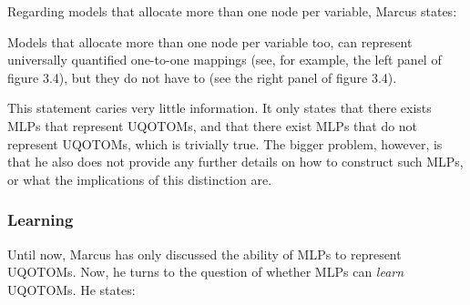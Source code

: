 \documentclass[../../main.tex]{subfiles}
\begin{document}
\begin{critique}
\begin{example}
        \begin{center}
            \label{fig:non_injective_function}
        \end{center}
    \end{example}
\end{critique}

Regarding models that allocate more than one node per variable, Marcus states:

\begin{citecallout}
    Models that allocate more than one node per variable too, can represent
    universally quantified one-to-one mappings (see, for example, the left
    panel of figure 3.4), but they do not have to (see the right panel of figure
    3.4).
\end{citecallout}

\begin{critique}
    This statement caries very little information. It only states that there exists MLPs that represent UQOTOMs, and that there exist MLPs that do not represent UQOTOMs, which is trivially true. The bigger problem, however, is that he also does not provide any further details on how to construct such MLPs, or what the implications of this distinction are.
\end{critique}

\subsubsection{Learning}
Until now, Marcus has only discussed the ability of MLPs to represent UQOTOMs. Now, he turns to the question of whether MLPs can \emph{learn} UQOTOMs. He states:
\end{document}
